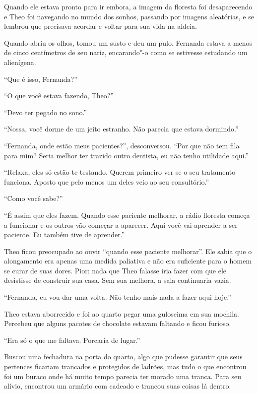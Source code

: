 Quando ele estava pronto para ir embora, a imagem da floresta foi
desaparecendo e Theo foi navegando no mundo dos sonhos, passando por
imagens aleatórias, e se lembrou que precisava acordar e voltar para sua
vida na aldeia.

Quando abriu os olhos, tomou um susto e deu um pulo. Fernanda estava a
menos de cinco centímetros de seu nariz, encarando"-o como se estivesse
estudando um alienígena.

``Que é isso, Fernanda?''

``O que você estava fazendo, Theo?''

``Devo ter pegado no sono.''

``Nossa, você dorme de um jeito estranho. Não parecia que estava
dormindo.''

``Fernanda, onde estão meus pacientes?'', desconversou. ``Por que não
tem fila para mim? Seria melhor ter trazido outro dentista, eu não tenho
utilidade aqui.''

``Relaxa, eles só estão te testando. Querem primeiro ver se o seu
tratamento funciona. Aposto que pelo menos um deles veio ao seu
consultório.''

``Como você sabe?''

``É assim que eles fazem. Quando esse paciente melhorar, a rádio
floresta começa a funcionar e os outros vão começar a aparecer. Aqui
você vai aprender a ser paciente. Eu também tive de aprender.''

Theo ficou preocupado ao ouvir ``quando esse paciente melhorar''. Ele
sabia que o alongamento era apenas uma medida paliativa e não era
suficiente para o homem se curar de suas dores. Pior: nada que Theo
falasse iria fazer com que ele desistisse de construir sua casa. Sem sua
melhora, a sala continuaria vazia.

``Fernanda, eu vou dar uma volta. Não tenho mais nada a fazer aqui
hoje.''

\asterisc


Theo estava aborrecido e foi ao quarto pegar uma guloseima em sua
mochila. Percebeu que alguns pacotes de chocolate estavam faltando e
ficou furioso.

``Era só o que me faltava. Porcaria de lugar.''

Buscou uma fechadura na porta do quarto, algo que pudesse garantir que
seus pertences ficariam trancados e protegidos de ladrões, mas tudo o
que encontrou foi um buraco onde há muito tempo parecia ter morado uma
tranca. Para seu alívio, encontrou um armário com cadeado e trancou suas
coisas lá dentro.

